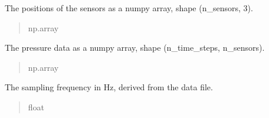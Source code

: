 \documentclass[letterpaper,10pt,english]{sphinxmanual}
\begin{document}
\begin{fulllineitems}
\begin{fulllineitems}
\begin{quote}
\begin{description}
\end{description}\end{quote}

\end{fulllineitems}


\begin{fulllineitems}
\label{\detokenize{io:amiet_self_noise.io_utils.InputData.pos}}
\pysigstartsignatures
\pysigline
{}
\pysigstopsignatures
\sphinxAtStartPar
The positions of the sensors as a numpy array, shape (n\_sensors, 3).
\begin{quote}\begin{description}
\sphinxAtStartPar
np.array

\end{description}\end{quote}

\end{fulllineitems}


\begin{fulllineitems}
\label{\detokenize{io:amiet_self_noise.io_utils.InputData.pressure}}
\pysigstartsignatures
\pysigline
{}
\pysigstopsignatures
\sphinxAtStartPar
The pressure data as a numpy array, shape (n\_time\_steps, n\_sensors).
\begin{quote}\begin{description}
\sphinxAtStartPar
np.array

\end{description}\end{quote}

\end{fulllineitems}


\begin{fulllineitems}
\label{\detokenize{io:amiet_self_noise.io_utils.InputData.fs}}
\pysigstartsignatures
\pysigline
{}
\pysigstopsignatures
\sphinxAtStartPar
The sampling frequency in Hz, derived from the data file.
\begin{quote}\begin{description}
\sphinxAtStartPar
float


\end{description}
\end{quote}
\end{fulllineitems}
\end{fulllineitems}
\end{document}
